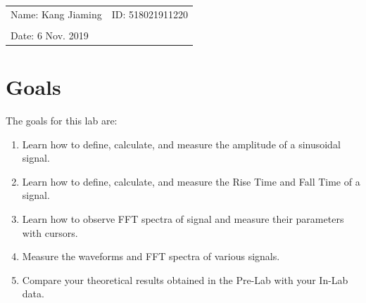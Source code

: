 \documentclass{article}
\begin{document}
\vspace*{0.25cm}

\noindent\hrulefill

\thispagestyle{empty}

\begin{center}
    \begin{large}
    \end{large}

    \hrulefill

    \vspace*{5cm}
    \begin{Large}
    \end{Large}

    \vspace{2em}

    \begin{large}
    \end{large}
\end{center}
\vfill

\begin{table}[h!]
    \flushleft
    \begin{tabular}{ll}
        Name: Kang Jiaming \hspace*{2em} &
        ID: 518021911220 \hspace*{2em}     \\

        \\

        Date:  6 Nov. 2019
    \end{tabular}
\end{table}

\hfill
\newpage

\section{Goals\label{goals}}
\noindent The goals for this lab are:
\begin{enumerate}
    \item Learn how to define, calculate, and measure the amplitude of a sinusoidal signal.
    \item Learn how to define, calculate, and measure the Rise Time and Fall Time of a signal.
    \item Learn how to observe FFT spectra of signal and measure their parameters with cursors.
    \item Measure the waveforms and FFT spectra of various signals.
    \item Compare your theoretical results obtained in the Pre-Lab with your In-Lab data.
\end{enumerate}
\end{document}
